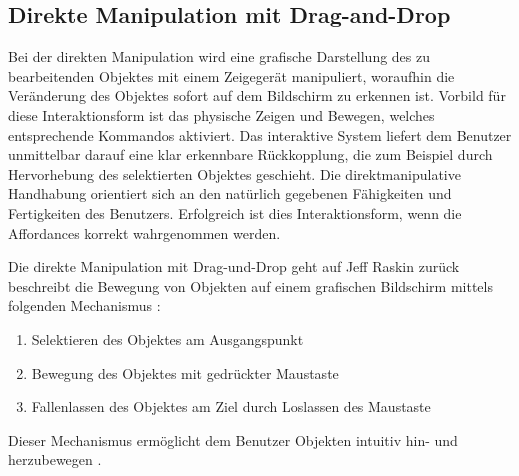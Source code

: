\pagebreak

\subsection{Direkte Manipulation mit Drag-and-Drop}
Bei der direkten Manipulation wird eine grafische Darstellung des zu bearbeitenden Objektes mit einem Zeigegerät manipuliert, woraufhin die Veränderung des Objektes sofort auf dem Bildschirm zu erkennen ist. Vorbild für diese Interaktionsform ist das physische Zeigen und Bewegen, welches entsprechende Kommandos aktiviert. Das interaktive System liefert dem Benutzer unmittelbar darauf eine klar erkennbare Rückkopplung, die zum Beispiel durch Hervorhebung des selektierten Objektes geschieht. Die direktmanipulative Handhabung orientiert sich an den natürlich gegebenen Fähigkeiten und Fertigkeiten des Benutzers. Erfolgreich ist dies Interaktionsform, wenn die Affordances korrekt wahrgenommen werden. \cite[S. 351]{2010.Preim}

Die direkte Manipulation mit Drag-und-Drop geht auf Jeff Raskin zurück beschreibt die Bewegung von Objekten auf einem grafischen Bildschirm mittels folgenden Mechanismus \cite[S. 184]{2010.Preim}:
\begin{enumerate}
    \item Selektieren des Objektes am Ausgangspunkt \cite[S. 184]{2010.Preim}
    \item Bewegung des Objektes mit gedrückter Maustaste \cite[S. 184]{2010.Preim}
    \item Fallenlassen des Objektes am Ziel durch Loslassen des Maustaste \cite[S. 184]{2010.Preim}
\end{enumerate}
Dieser Mechanismus ermöglicht dem Benutzer Objekten intuitiv hin- und herzubewegen \cite[S. 129]{2010.Preim}.

